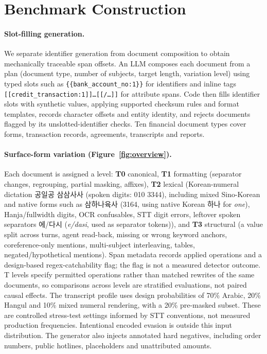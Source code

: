 \section{Benchmark Construction}
\label{sec:benchmark}

\paragraph{Slot-filling generation.}
We separate identifier generation from document composition to obtain mechanically traceable span offsets. An LLM composes each document from a plan (document type, number of subjects, target length, variation level) using typed slots such as \texttt{\{\{bank\_account\_no:1\}\}} for identifiers and inline tags \texttt{[[credit\_transaction:1]]…[[/…]]} for attribute spans. Code then fills identifier slots with synthetic values, applying supported checksum rules and format templates, records character offsets and entity identity, and rejects documents flagged by its unslotted-identifier checks. Ten financial document types cover forms, transaction records, agreements, transcripts and reports.

\paragraph{Surface-form variation (Figure~\ref{fig:overview}).}
Each document is assigned a level: \textbf{T0} canonical, \textbf{T1} formatting (separator changes, regrouping, partial masking, affixes), \textbf{T2} lexical (Korean-numeral dictation \textup{공일공 삼삼사사} (spoken digits: 010 3344), including mixed Sino-Korean and native forms such as \textup{삼하나육사} (3164, using native Korean \textup{하나} for \emph{one}), Hanja/fullwidth digits, OCR confusables, STT digit errors, leftover spoken separators \textup{에}/\textup{다시} (\emph{e/dasi}, used as separator tokens)), and \textbf{T3} structural (a value split across turns, agent read-back, missing or wrong keyword anchors, coreference-only mentions, multi-subject interleaving, tables, negated/hypothetical mentions). Span metadata records applied operations and a design-based regex-catchability flag; the flag is not a measured detector outcome. T levels specify permitted operations rather than matched rewrites of the same documents, so comparisons across levels are stratified evaluations, not paired causal effects. The transcript profile uses design probabilities of 70\% Arabic, 20\% Hangul and 10\% mixed numeral rendering, with a 20\% pre-masked subset. These are controlled stress-test settings informed by STT conventions, not measured production frequencies. Intentional encoded evasion is outside this input distribution. The generator also injects annotated hard negatives, including order numbers, public hotlines, placeholders and unattributed amounts.

